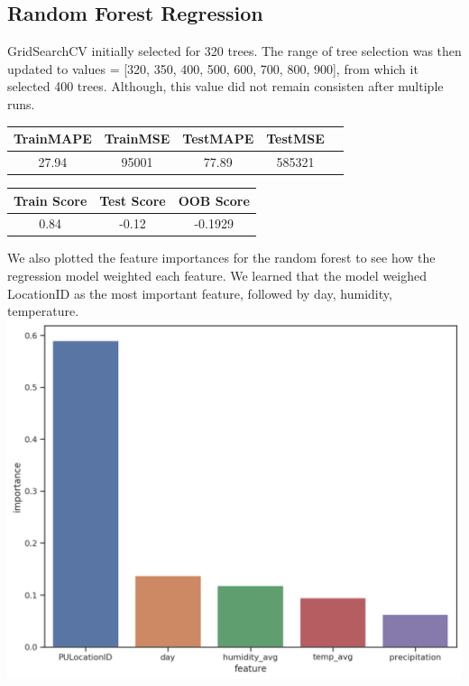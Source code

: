 \documentclass[journal]{IEEEtran}
\begin{document}
\subsection{Random Forest Regression} 

\noindent GridSearchCV initially selected for 320 trees. The range of tree selection was then updated to   values = [320, 350, 400, 500, 600, 700, 800, 900], from which it selected 400 trees. Although, this value did not remain consisten after multiple runs.\\

\begingroup
    \medskip
    \centering
    \def\arraystretch{1.5}
        \begin{tabular}{ccccc}
            \toprule
            TrainMAPE & TrainMSE & TestMAPE & TestMSE\\
            \midrule
            27.94 & 95001 & 77.89 & 585321\\
            \bottomrule
        \end{tabular}
    \label{table:}
    \medskip
\endgroup

\begingroup
    \medskip
    \centering
    \def\arraystretch{1.5}
        \begin{tabular}{ccc}
            \toprule
            Train Score & Test Score & OOB Score\\
            \midrule
            0.84 & -0.12 & -0.1929\\
            \bottomrule
        \end{tabular}
    \label{table:fifty_runs}
    \medskip
\endgroup

\noindent We also plotted the feature importances for the random forest to see how the regression model weighted each feature. We learned that the model weighed LocationID as the most important feature, followed by day, humidity, temperature.\\

\begingroup
    \centering
    \includegraphics[width=\columnwidth]{report/images/feature_importance_rf.png}
    \label{fig:train_test_df}
    \medskip
\endgroup
\end{document}

